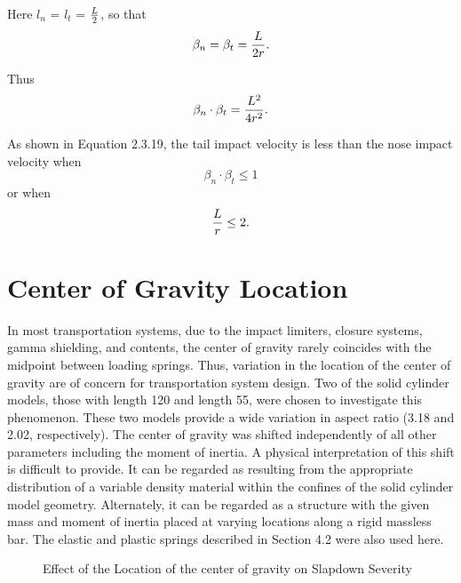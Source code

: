 Here $l_{n}$ = $l_{t}$ = ${{L}\over{2}}$, so that
\begin{equation}
\beta_{n} = \beta_{t} = {{L}\over{2r}}.
\end{equation}

Thus
\begin{equation}
\beta_{n}\cdot\beta_{t} = {{L^{2}}\over{4r^{2}}}.
\end{equation}

As shown in Equation 2.3.19, the tail impact velocity is less than the
nose impact velocity when
\begin{equation}
\beta_{n} \cdot \beta_{t}\leq 1
\end{equation}
or when
\begin{equation}
{{L}\over{r}} \leq 2.
\end{equation}

\section{Center of Gravity Location}

     In most
transportation systems, due to the impact limiters, closure
systems, gamma shielding, and contents, the center of gravity rarely
coincides with the midpoint between loading springs. Thus,
variation in the location of the center of gravity
are of concern for transportation system design.  Two of the solid
cylinder models, those with length 120 and length 55, were chosen to
investigate this phenomenon.  These two models provide a wide
variation in aspect ratio (3.18 and 2.02, respectively).  The
center of gravity was shifted independently of all other parameters
including the moment of inertia. A physical interpretation of this
shift is difficult to provide.  It can be regarded as resulting from
the appropriate distribution of a variable density material within the
confines of the solid cylinder model geometry.  Alternately, it can be
regarded as a structure with the given mass and moment of inertia
placed at varying locations along a rigid massless bar. The elastic
and plastic springs described in Section 4.2 were also used here.

\begin{figure}
\vspace{3.5 in}
\caption{Effect of the Location of the center of gravity on Slapdown
Severity}
\end{figure}


